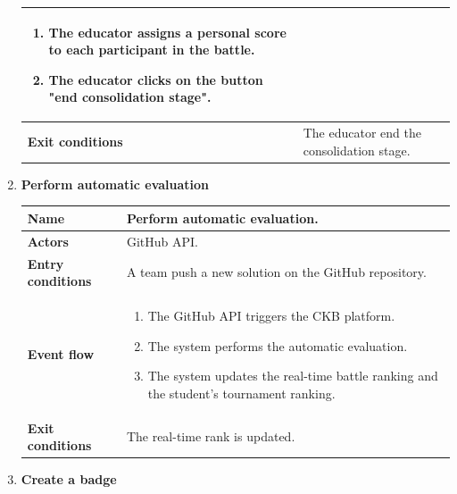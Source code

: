 \begin{enumerate}[label=\textbf{UC.\arabic*}]
\begin{table}[H]
\begin{tabular}{|m{3.2cm}|m{9.8cm}|}
\begin{enumerate}[label=\arabic*.]
                        \item The educator assigns a personal score to each participant in the battle.
                        \item The educator clicks on the button "end consolidation stage".
                    \end{enumerate}\\ 
                    \hline
                    \textbf{Exit conditions}  &  The educator end the consolidation stage. \\
                    \hline
                \end{tabular}
        \end{table}
        \item {} \textbf{Perform automatic evaluation}
        \begin{table}[H]
    	    \centering
                \renewcommand{\arraystretch}{1.5}
                \begin{tabular}{|m{3.2cm}|m{9.8cm}|}
                    \hline
                    \textbf{Name} & Perform automatic evaluation. \\
                    \hline
                    \textbf{Actors} & GitHub API. \\
                    \hline
                    \textbf{Entry conditions}  & A team push a new solution on the GitHub repository. \\
                    \hline
                    \textbf{Event flow}  & 
                    \begin{enumerate}[label=\arabic*.]
                        \item The GitHub API triggers the CKB platform.
                        \item The system performs the automatic evaluation.
                        \item The system updates the real-time battle ranking and the student's tournament ranking.
                    \end{enumerate}\\ 
                    \hline
                    \textbf{Exit conditions}  &  The real-time rank is updated. \\
                    \hline
                \end{tabular}
        \end{table}
        \item {} \textbf{Create a badge}
        \begin{table}[H]

\end{table}
\end{enumerate}
